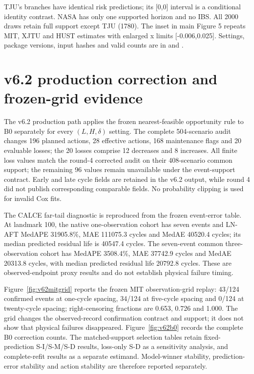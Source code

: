 \documentclass[10pt,a4paper]{article}
\begin{document}
TJU's branches have identical risk predictions; its [0,0] interval is a conditional identity contrast. NASA has only one supported horizon and no IBS. All 2000 draws retain full support except TJU (1780). The inset in main Figure 5 repeats MIT, XJTU and HUST estimates with enlarged x limits [-0.006,0.025]. Settings, package versions, input hashes and valid counts are in  and .

\section*{v6.2 production correction and frozen-grid evidence}
The v6.2 production path applies the frozen nearest-feasible opportunity rule to B0 separately for every $(L,H,\delta)$ setting. The complete 504-scenario audit changes 196 planned actions, 28 effective actions, 168 maintenance flags and 20 evaluable losses; the 20 losses comprise 12 decreases and 8 increases. All finite loss values match the round-4 corrected audit on their 408-scenario common support; the remaining 96 values remain unavailable under the event-support contract. Early and late cycle fields are retained in the v6.2 output, while round 4 did not publish corresponding comparable fields. No probability clipping is used for invalid Cox fits.

The CALCE far-tail diagnostic is reproduced from the frozen event-error table. At landmark 100, the native one-observation cohort has seven events and LN-AFT MedAPE 31905.8\%, MAE 111075.3 cycles and MedAE 40520.4 cycles; its median predicted residual life is 40547.4 cycles. The seven-event common three-observation cohort has MedAPE 3508.4\%, MAE 37742.9 cycles and MedAE 20313.8 cycles, with median predicted residual life 20792.8 cycles. These are observed-endpoint proxy results and do not establish physical failure timing.

Figure~\ref{fig:v62mitgrid} reports the frozen MIT observation-grid replay: 43/124 confirmed events at one-cycle spacing, 34/124 at five-cycle spacing and 0/124 at twenty-cycle spacing; right-censoring fractions are 0.653, 0.726 and 1.000. The grid changes the observed-record confirmation contract and support; it does not show that physical failures disappeared. Figure~\ref{fig:v62b0} records the complete B0 correction counts. The matched-support selection tables retain fixed-prediction S-I/S-M/S-D results, loss-only S-D as a sensitivity analysis, and complete-refit results as a separate estimand. Model-winner stability, prediction-error stability and action stability are therefore reported separately.
\end{document}
